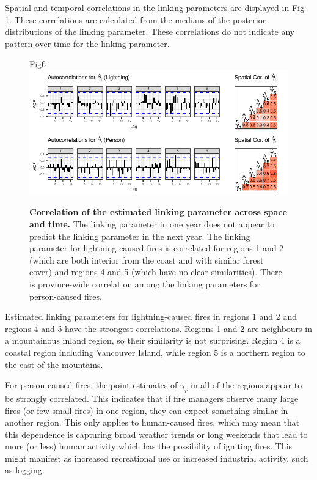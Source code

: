 \documentclass[10pt,letterpaper]{article}
\begin{document}
Spatial and temporal correlations in the linking parameters are
displayed in Fig \ref{spatialcor}. These correlations are calculated
from the medians of the posterior distributions of the linking parameter. These correlations do not indicate any
pattern over time for the linking parameter.

\begin{figure}[h!]
\centering
Fig6
\includegraphics[width=\textwidth]{Joint_Count_Files/spatialcor-1.pdf}
\caption{\label{spatialcor}\textbf{Correlation of the estimated linking
parameter across space and time.} The linking parameter in one year does
not appear to predict the linking parameter in the next year. The
linking parameter for lightning-caused fires is correlated for regions 1
and 2 (which are both interior from the coast and with similar forest
cover) and regions 4 and 5 (which have no clear similarities). There is
province-wide correlation among the linking parameters for person-caused
fires.}
\end{figure}

Estimated linking parameters for lightning-caused fires in regions 1 and
2 and regions 4 and 5 have the strongest correlations. Regions 1 and 2
are neighbours in a mountainous inland region, so their similarity is
not surprising. Region 4 is a coastal region including Vancouver Island,
while region 5 is a northern region to the east of the mountains.

For person-caused fires, the point estimates of \(\gamma_r\) in all of
the regions appear to be strongly correlated. This indicates that if
fire managers observe many large fires (or few small fires) in one
region, they can expect something similar in another region. This only
applies to human-caused fires, which may mean that this dependence is
capturing broad weather trends or long weekends that lead to more (or less) human
activity which has the possibility of igniting fires. This might manifest
as increased recreational use or increased industrial activity, such as logging.
\end{document}

